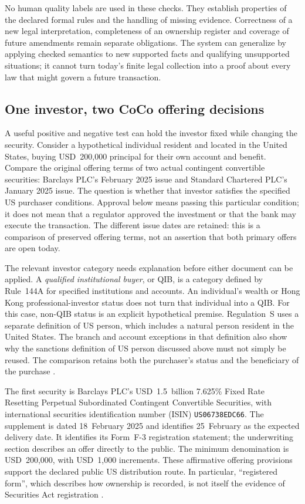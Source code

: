 \documentclass[12pt,a4paper,oneside,openany]{book}
\begin{document}
No human quality labels are used in these checks. They establish properties of
the declared formal rules and the handling of missing evidence. Correctness of
a new legal interpretation, completeness of an ownership register and coverage
of future amendments remain separate obligations. The system can generalize by
applying checked semantics to new supported facts and qualifying unsupported
situations; it cannot turn today's finite legal collection into a proof about
every law that might govern a future transaction.

\subsection{One investor, two CoCo offering decisions}
\label{sec:coco-purchaser-cases}

A useful positive and negative test can hold the investor fixed while changing
the security. Consider a hypothetical individual resident and located in the
United States, buying USD~200,000 principal for their own account and benefit.
Compare the original offering terms of two actual contingent convertible
securities: Barclays PLC's February 2025 issue and Standard Chartered PLC's
January 2025 issue. The question is whether that investor satisfies the
specified US purchaser conditions. Approval below means passing this particular
condition; it does not mean that a regulator approved the investment or that
the bank may execute the transaction. The different issue dates are retained:
this is a comparison of preserved offering terms, not an assertion that both
primary offers are open today.

The relevant investor category needs explanation before either document can be
applied. A \emph{qualified institutional buyer}, or QIB, is a category defined
by Rule~144A for specified institutions and accounts. An individual's wealth
or Hong Kong professional-investor status does not turn that individual into
a QIB. For this case, non-QIB status is an explicit hypothetical premise.
Regulation~S uses a separate definition of US person, which includes a natural
person resident in the United States. The branch and account exceptions in that
definition also show why the sanctions definition of US person discussed above
must not simply be reused. The comparison retains both the purchaser's status
and the beneficiary of the purchase
\citep[Rule~144A(a)(1); Regulation~S, section~230.902(k)]{rule144acoco2025,regsdefinitions2025}.

The first security is Barclays PLC's USD~1.5~billion 7.625\% Fixed Rate Resetting
Perpetual Subordinated Contingent Convertible Securities, with international
securities identification number (ISIN)
\texttt{US06738EDC66}. The supplement is dated 18~February 2025 and identifies
25~February as the expected delivery date. It identifies its Form~F-3
registration statement; the underwriting section describes an offer directly
to the public. The minimum denomination is USD~200,000, with USD~1,000 increments.
These affirmative offering provisions support the declared public US
distribution route. In particular, ``registered form'', which describes how
ownership is recorded, is not itself the evidence of Securities Act registration
\citep[cover; pp.~S-6, S-22 and S-99]{barclayscoco2025}.
\end{document}
